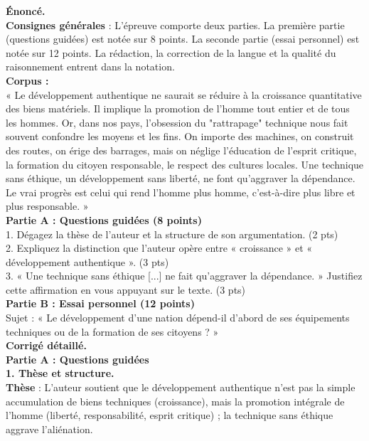 \documentclass[11pt]{article}
\begin{document}
\begin{exoresolu}
\textbf{Énoncé.}\\
\textbf{Consignes générales} : L'épreuve comporte deux parties. La première partie (questions guidées) est notée sur 8 points. La seconde partie (essai personnel) est notée sur 12 points. La rédaction, la correction de la langue et la qualité du raisonnement entrent dans la notation.\\
\textbf{Corpus :}\\
« Le développement authentique ne saurait se réduire à la croissance quantitative des biens matériels. Il implique la promotion de l'homme tout entier et de tous les hommes. Or, dans nos pays, l'obsession du "rattrapage" technique nous fait souvent confondre les moyens et les fins. On importe des machines, on construit des routes, on érige des barrages, mais on néglige l'éducation de l'esprit critique, la formation du citoyen responsable, le respect des cultures locales. Une technique sans éthique, un développement sans liberté, ne font qu'aggraver la dépendance. Le vrai progrès est celui qui rend l'homme plus homme, c'est-à-dire plus libre et plus responsable. »\\
\textbf{Partie A : Questions guidées (8 points)}\\
1. Dégagez la thèse de l'auteur et la structure de son argumentation. (2 pts)\\
2. Expliquez la distinction que l'auteur opère entre « croissance » et « développement authentique ». (3 pts)\\
3. « Une technique sans éthique [...] ne fait qu'aggraver la dépendance. » Justifiez cette affirmation en vous appuyant sur le texte. (3 pts)\\
\textbf{Partie B : Essai personnel (12 points)}\\
Sujet : « Le développement d'une nation dépend-il d'abord de ses équipements techniques ou de la formation de ses citoyens ? »\\
\vspace{0.5cm}
\tcblower
\textbf{Corrigé détaillé.}\\
\textbf{Partie A : Questions guidées}\\
\textbf{1. Thèse et structure.}\\
\textbf{Thèse} : L'auteur soutient que le développement authentique n'est pas la simple accumulation de biens techniques (croissance), mais la promotion intégrale de l'homme (liberté, responsabilité, esprit critique) ; la technique sans éthique aggrave l'aliénation.\\

\end{exoresolu}
\end{document}
